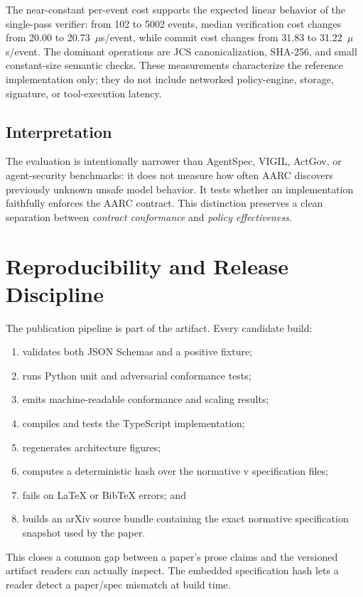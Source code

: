\documentclass{article}
\begin{document}
The near-constant per-event cost supports the expected linear behavior of the
single-pass verifier: from 102 to 5002 events, median verification cost changes
from 20.00 to 20.73~$\mu$s/event, while commit cost changes from 31.83 to
31.22~$\mu$s/event. The dominant operations are JCS canonicalization, SHA-256,
and small constant-size semantic checks. These measurements characterize the
reference implementation only; they do not include networked policy-engine,
storage, signature, or tool-execution latency.

\subsection{Interpretation}

The evaluation is intentionally narrower than AgentSpec, VIGIL, ActGov, or
agent-security benchmarks: it does not measure how often AARC discovers
previously unknown unsafe model behavior. It tests whether an implementation
faithfully enforces the AARC contract. This distinction preserves a clean
separation between \emph{contract conformance} and \emph{policy effectiveness}.

\section{Reproducibility and Release Discipline}

The publication pipeline is part of the artifact. Every candidate build:

\begin{enumerate}[leftmargin=*]
  \item validates both JSON Schemas and a positive fixture;
  \item runs Python unit and adversarial conformance tests;
  \item emits machine-readable conformance and scaling results;
  \item compiles and tests the TypeScript implementation;
  \item regenerates architecture figures;
  \item computes a deterministic hash over the normative v\specVersion{}
  specification files;
  \item fails on LaTeX or BibTeX errors; and
  \item builds an arXiv source bundle containing the exact normative
  specification snapshot used by the paper.
\end{enumerate}

This closes a common gap between a paper's prose claims and the versioned
artifact readers can actually inspect. The embedded specification hash lets a
reader detect a paper/spec mismatch at build time.
\end{document}
